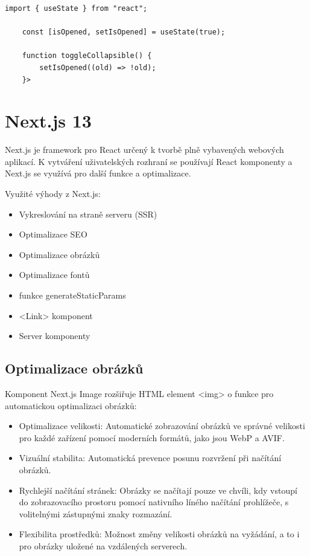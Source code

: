 \documentclass[12pt, a4paper,
oneside,      %
openright
]{report}
\begin{document}
\vspace{10pt}

\begin{lstlisting}[style=JavaScript, title={Kód}, caption={Ukázka useState() v Collapsible.jsx}] 
	import { useState } from "react";
	
	const [isOpened, setIsOpened] = useState(true);
	
	function toggleCollapsible() {
		setIsOpened((old) => !old);
	}>
\end{lstlisting}

\section{Next.js 13}
Next.js je framework pro React určený k tvorbě plně vybavených webových aplikací. K vytváření uživatelských rozhraní se používají React komponenty a Next.js se využívá pro další funkce a optimalizace.

\vspace{10pt}

Využité výhody z Next.js:
\begin{itemize}
	\item Vykreslování na straně serveru (SSR)
	\item Optimalizace SEO
	\item Optimalizace obrázků
	\item Optimalizace fontů
	\item funkce generateStaticParams
	\item <Link> komponent
	\item Server komponenty
\end{itemize}

\subsection{Optimalizace obrázků}
Komponent Next.js Image rozšiřuje HTML element <img> o funkce pro automatickou optimalizaci obrázků:

\begin{itemize}
	\item Optimalizace velikosti: Automatické zobrazování obrázků ve správné velikosti pro každé zařízení pomocí moderních formátů, jako jsou WebP a AVIF.
	\item Vizuální stabilita: Automatická prevence posunu rozvržení při načítání obrázků.
	\item Rychlejší načítání stránek: Obrázky se načítají pouze ve chvíli, kdy vstoupí do zobrazovacího prostoru pomocí nativního líného načítání prohlížeče, s volitelnými zástupnými znaky rozmazání.
	\item Flexibilita prostředků:  Možnost změny velikosti obrázků na vyžádání, a to i pro obrázky uložené na vzdálených serverech.
\end{itemize}
\end{document}
